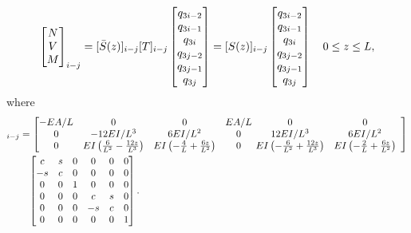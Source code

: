 \documentclass{AeroStructure-ERJohnson}
\begin{document}
\begin{align}\label{eq16.92}
\left[\begin{array}{@{}c@{}}N \\V \\M\end{array}\right]_{i-j}=[\bar{S}(z)]_{i-j}[T]_{i-j}\left[\begin{array}{@{}c@{}}q_{3 i-2} \\q_{3 i-1} \\q_{3 i} \\q_{3 j-2} \\q_{3 j-1} \\q_{3 j}\end{array}\right]=[S(z)]_{i-j}\left[\begin{array}{@{}c@{}}q_{3 i-2} \\q_{3 i-1} \\q_{3 i} \\q_{3 j-2} \\q_{3 j-1} \\q_{3 j}\end{array}\right] \quad 0 \leq z \leq L,
\end{align}
where
\begin{align*}
[S(z)]_{i-j}&=\left[\begin{array}{@{}cccc@{}}-E A / L & 0 & 0 & E A / L \\0 & -12 E I / L^{3} & 6 E I / L^{2} & 0 \\0 & E I\left(\frac{6}{L^{2}}-\frac{12 z}{L^{3}}\right) & E I\left(-\frac{4}{L}+\frac{6 z}{L^{2}}\right) & 0\end{array}\right.\left.\begin{array}{@{}ccc@{}}0 & 0 \\12 E I / L^{3} & 6 E I / L^{2} \\E I\left(-\frac{6}{L^{2}}+\frac{12 z}{L^{3}}\right) & E I\left(-\frac{2}{L}+\frac{6 z}{L^{2}}\right)\end{array}\right] \\
&\quad\hspace*{-1.4pt}\left[\begin{array}{@{}cccccc@{}}c & s & 0 & 0 & 0 & 0 \\-s & c & 0 & 0 & 0 & 0 \\0 & 0 & 1 & 0 & 0 & 0 \\0 & 0 & 0 & c & s & 0 \\0 & 0 & 0 & -s & c & 0 \\0 & 0 & 0 & 0 & 0 & 1\end{array}\right].
\end{align*}
\end{document}
